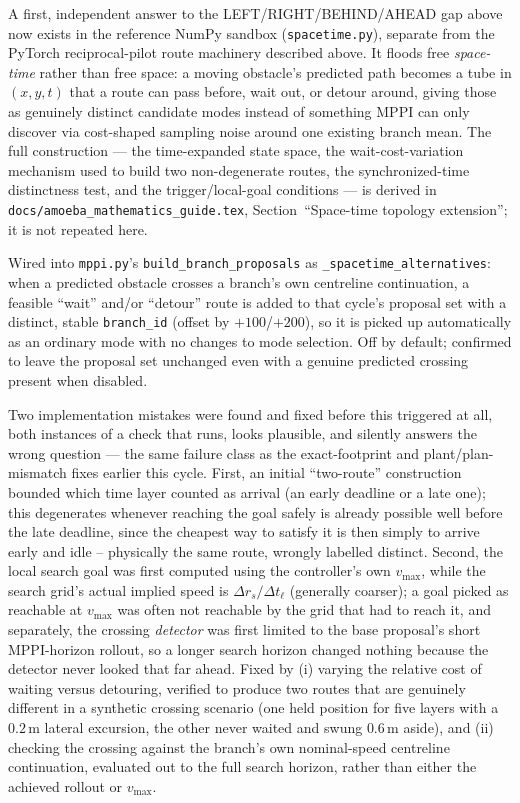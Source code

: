 \documentclass[11pt,a4paper]{article}
\begin{document}
A first, independent answer to the LEFT/RIGHT/BEHIND/AHEAD gap above now
exists in the reference NumPy sandbox (\texttt{spacetime.py}), separate from
the PyTorch reciprocal-pilot route machinery described above. It floods free
\emph{space-time} rather than free space: a moving obstacle's predicted path
becomes a tube in $(x,y,t)$ that a route can pass before, wait out, or detour
around, giving those as genuinely distinct candidate modes instead of
something MPPI can only discover via cost-shaped sampling noise around one
existing branch mean. The full construction --- the time-expanded state
space, the wait-cost-variation mechanism used to build two non-degenerate
routes, the synchronized-time distinctness test, and the trigger/local-goal
conditions --- is derived in
\texttt{docs/amoeba\_mathematics\_guide.tex}, Section~``Space-time topology
extension''; it is not repeated here.

Wired into \texttt{mppi.py}'s \texttt{build\_branch\_proposals} as
\texttt{\_spacetime\_alternatives}: when a predicted obstacle crosses a
branch's own centreline continuation, a feasible ``wait'' and/or ``detour''
route is added to that cycle's proposal set with a distinct, stable
\texttt{branch\_id} (offset by $+100$/$+200$), so it is picked up automatically
as an ordinary mode with no changes to mode selection. Off by default;
confirmed to leave the proposal set unchanged even with a genuine predicted
crossing present when disabled.

Two implementation mistakes were found and fixed before this triggered at
all, both instances of a check that runs, looks plausible, and silently
answers the wrong question --- the same failure class as the exact-footprint
and plant/plan-mismatch fixes earlier this cycle. First, an initial
``two-route'' construction bounded which time layer counted as arrival
(an early deadline or a late one); this degenerates whenever reaching the
goal safely is already possible well before the late deadline, since the
cheapest way to satisfy it is then simply to arrive early and idle --
physically the same route, wrongly labelled distinct. Second, the local
search goal was first computed using the controller's own $v_{\max}$, while
the search grid's actual implied speed is $\Delta r_s/\Delta t_\ell$
(generally coarser); a goal picked as reachable at $v_{\max}$ was often not
reachable by the grid that had to reach it, and separately, the crossing
\emph{detector} was first limited to the base proposal's short MPPI-horizon
rollout, so a longer search horizon changed nothing because the detector
never looked that far ahead. Fixed by (i) varying the relative cost of
waiting versus detouring, verified to produce two routes that are genuinely
different in a synthetic crossing scenario (one held position for five
layers with a $0.2\,$m lateral excursion, the other never waited and swung
$0.6\,$m aside), and (ii) checking the crossing against the branch's own
nominal-speed centreline continuation, evaluated out to the full search
horizon, rather than either the achieved rollout or $v_{\max}$.
\end{document}
